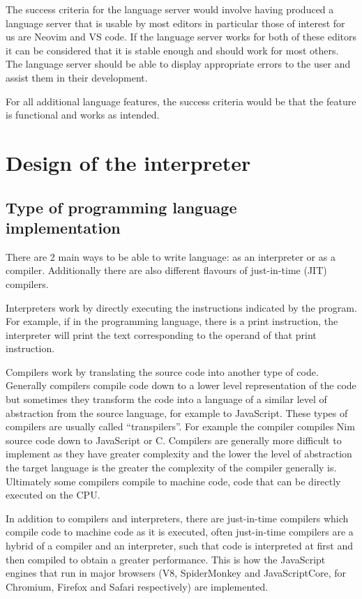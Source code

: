 \documentclass{article}
\begin{document}
The success criteria for the language server would involve having produced a
language server that is usable by most editors in particular those of interest
for us are Neovim and VS code. If the language server works for both of these
editors it can be considered that it is stable enough and should work for most
others. The language server should be able to display appropriate errors to the
user and assist them in their development.

For all additional language features, the success criteria would be that the
feature is functional and works as intended.

\section{Design of the interpreter}
\label{sec:design_int}

\subsection{Type of programming language implementation}

There are 2 main ways to be able to write language: as an interpreter or as a
compiler. Additionally there are also different flavours of just-in-time (JIT)
compilers.

Interpreters work by directly executing the instructions indicated by the
program. For example, if in the programming language, there is a print
instruction, the interpreter will print the text corresponding to the operand
of that print instruction.

Compilers work by translating the source code into another type of code.
Generally compilers compile code down to a lower level representation of the
code but sometimes they transform the code into a language of a similar level
of abstraction from the source language, for example to JavaScript. These types
of compilers are usually called ``transpilers''. For example the
 compiler compiles Nim source code down to JavaScript or C.
Compilers are generally more difficult to implement as they have greater
complexity and the lower the level of abstraction the target language is the
greater the complexity of the compiler generally is. Ultimately some compilers
compile to machine code, code that can be directly executed on the CPU.

In addition to compilers and interpreters, there are just-in-time compilers
which compile code to machine code as it is executed, often just-in-time
compilers are a hybrid of a compiler and an interpreter, such that code is
interpreted at first and then compiled to obtain a greater performance. This is
how the JavaScript engines that run in major browsers (V8, SpiderMonkey and
JavaScriptCore, for Chromium, Firefox and Safari respectively) are implemented.
\end{document}
